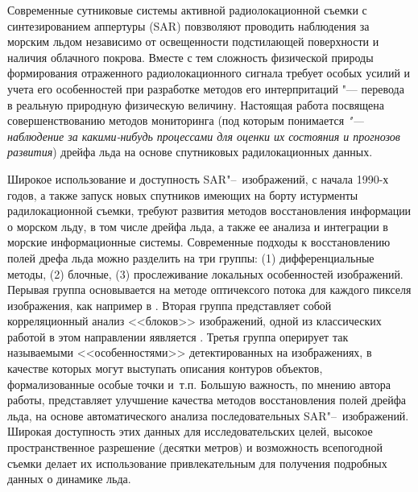 Современные сутниковые системы активной радиолокационной съемки с синтезированием аппертуры (SAR)  \cite{sar} повзволяют проводить наблюдения за морским льдом независимо от освещенности подстилающей поверхности и наличия облачного покрова. Вместе с тем сложность физической природы формирования отраженного радиолокационного сигнала требует особых усилий и учета его особенностей при разработке методов его интерпритаций "--- перевода в реальную природную физическую величину. Настоящая работа посвящена совершенствованию методов мониторинга (под которым понимается \textit{"--- наблюдение за какими-нибудь процессами для оценки их состояния и прогнозов развития}) дрейфа льда на основе спутниковых радилокационных данных.

Широкое использование и доступность SAR"--~изображений, с начала 1990-х годов, а также запуск новых спутников имеющих на борту истурменты радилокационной съемки, требуют развития методов восстановления информации о морском льду, в том числе дрейфа льда, а также ее анализа и интеграции в морские информационные системы. Современные подходы к восстановлению полей дрефа льда можно разделить на три группы: (1) дифференциальные методы, (2) блочные, (3) прослеживание локальных особенностей изображений. Перывая группа основывается на методе оптичексого потока для каждого пикселя изображения, как например в \cite{sun1996automatic}. Вторая группа представляет собой корреляционный анализ <<блоков>> изображений, одной из классических работой в этом направлении яявляется \cite{fily1986extracting}. Третья группа оперирует так называемыми <<особенностями>> детектированных на изображениях, в качестве которых могут выступать описания контуров объектов, формализованные особые точки и~т.\:п. \cite{daida1990object,mcconnell1991psi} 
Большую важность, по мнению автора работы, представляет улучшение качества методов восстановления полей дрейфа льда, на основе автоматического анализа последовательных SAR"--~изображений. Широкая доступность этих данных для исследовательских целей, высокое пространственное разрешение (десятки метров) и возможность всепогодной съемки делает их использование привлекательным для получения подробных данных о динамике льда.




